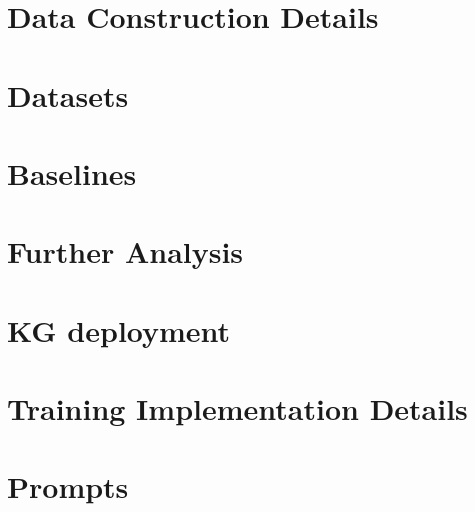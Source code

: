 \newpage
\appendix

% 

% 






\section{Data Construction Details}
\label{app:data_construction}




\section{Datasets}
\label{app:datasets}



\section{Baselines}
\label{app:baselines}





\section{Further Analysis}





\section{KG deployment}




\newpage
\section{Training Implementation Details}
\label{app:training_details}





\section{Prompts}
\label{app:prompts}


